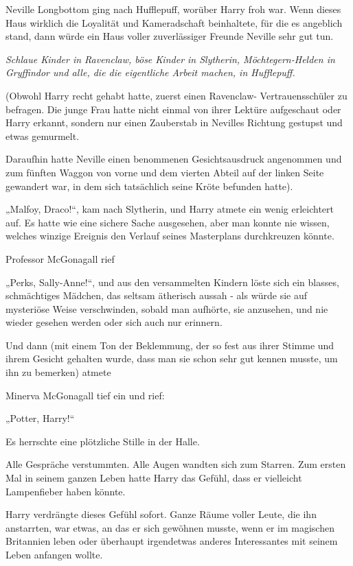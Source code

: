 {Neville Longbottom ging nach Hufflepuff, worüber Harry froh war. Wenn dieses Haus wirklich die Loyalität und Kameradschaft beinhaltete, für die es angeblich stand, dann würde ein Haus voller zuverlässiger Freunde Neville sehr gut tun.

\emph{Schlaue Kinder in Ravenclaw, böse Kinder in Slytherin, Möchtegern-Helden in Gryffindor und alle, die die eigentliche Arbeit machen, in Hufflepuff.}

(Obwohl Harry recht gehabt hatte, zuerst einen Ravenclaw- Vertrauensschüler zu befragen. Die junge Frau hatte nicht einmal von ihrer Lektüre aufgeschaut oder Harry erkannt, sondern nur einen Zauberstab in Nevilles Richtung gestupst und etwas gemurmelt.

Daraufhin hatte Neville einen benommenen Gesichtsausdruck angenommen und zum fünften Waggon von vorne und dem vierten Abteil auf der linken Seite gewandert war, in dem sich tatsächlich seine Kröte befunden hatte).

„Malfoy, Draco!“, kam nach Slytherin, und Harry atmete ein wenig erleichtert auf. Es hatte wie eine sichere Sache ausgesehen, aber man konnte nie wissen, welches winzige Ereignis den Verlauf seines Masterplans durchkreuzen könnte.

Professor McGonagall rief

„Perks, Sally-Anne!“, und aus den versammelten Kindern löste sich ein blasses, schmächtiges Mädchen, das seltsam ätherisch aussah - als würde sie auf mysteriöse Weise verschwinden, sobald man aufhörte, sie anzusehen, und nie wieder gesehen werden oder sich auch nur erinnern.

Und dann (mit einem Ton der Beklemmung, der so fest aus ihrer Stimme und ihrem Gesicht gehalten wurde, dass man sie schon sehr gut kennen musste, um ihn zu bemerken) atmete

Minerva McGonagall tief ein und rief:

„Potter, Harry!“

Es herrschte eine plötzliche Stille in der Halle.

Alle Gespräche verstummten. Alle Augen wandten sich zum Starren. Zum ersten Mal in seinem ganzen Leben hatte Harry das Gefühl, dass er vielleicht Lampenfieber haben könnte.

Harry verdrängte dieses Gefühl sofort. Ganze Räume voller Leute, die ihn anstarrten, war etwas, an das er sich gewöhnen musste, wenn er im magischen Britannien leben oder überhaupt irgendetwas anderes Interessantes mit seinem Leben anfangen wollte.

}
